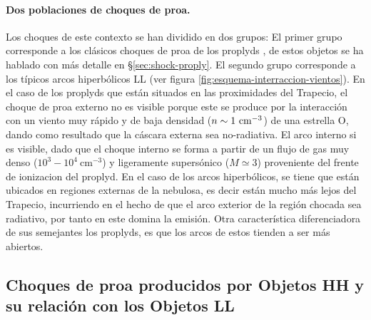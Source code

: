 \paragraph{Dos poblaciones de choques de proa.}
Los choques de este contexto se han dividido en dos grupos: El primer grupo corresponde a los clásicos choques de proa de los proplyds \citep{Robberto:2005, Bally:1998a}, de estos objetos se ha hablado con más detalle en \S\ref{sec:shock-proply}. El segundo grupo corresponde a los típicos arcos hiperbólicos LL (ver figura \ref{fig:esquema-interraccion-vientos}). En el caso de los proplyds que están situados en las proximidades del Trapecio, el choque de proa externo no es visible porque este se produce por la interacción con un viento muy rápido y de baja densidad (\(n \sim 1 ~\mathrm{cm}^{-3}\)) de una estrella O, dando como resultado que la cáscara externa sea no-radiativa. El arco interno si es visible, dado que el choque interno se forma a partir de un flujo de gas muy denso (\(10^{3}-10^{4}~\text{cm}^{-3}\)) y ligeramente supersónico (\(M \simeq 3\)) proveniente del frente de ionizacion del proplyd. En el caso de los arcos hiperbólicos, se tiene que están ubicados en regiones externas de la nebulosa, es decir están mucho más lejos del Trapecio, incurriendo en el hecho de que el arco exterior de la región chocada sea radiativo, por tanto en este domina la emisión. Otra característica diferenciadora de sus semejantes los proplyds, es que los arcos de estos tienden a ser más abiertos.\\ 

\subsection{Choques de proa producidos por Objetos HH y su relación con los Objetos LL}
\label{sec:herbig}

